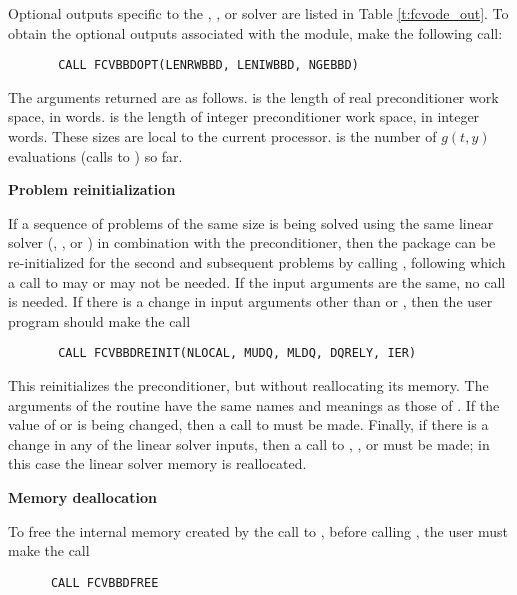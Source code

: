\begin{Steps}
  Optional outputs specific to the {\spgmr}, {\spbcg}, or {\sptfqmr} solver are 
  listed in Table \ref{t:fcvode_out}.
  To obtain the optional outputs associated with the {\cvbbdpre} module, make
  the following call:
\begin{verbatim}
       CALL FCVBBDOPT(LENRWBBD, LENIWBBD, NGEBBD)
\end{verbatim}
  The arguments returned are as follows.
   is the length of real preconditioner work space, in 
  words.  is the length of integer preconditioner work space, in
  integer words.  These sizes are local to the current processor.
   is the number of $g(t,y)$ evaluations (calls to ) so far.
  
\item {\bf Problem reinitialization}
  
  If a sequence of problems of the same size is being solved using the same
  linear solver ({\spgmr}, {\spbcg}, or {\sptfqmr})  in combination with the
  {\cvbbdpre} preconditioner, then the {\cvode} package can be re-initialized
  for the second and subsequent problems by calling ,
  following which a call to  may or may not be needed.
  If the input arguments are the same, no  call is needed.
  If there is a change in input arguments other than  or ,
  then the user program should make the call 
\begin{verbatim}
       CALL FCVBBDREINIT(NLOCAL, MUDQ, MLDQ, DQRELY, IER)
\end{verbatim}
  This reinitializes the {\cvbbdpre} preconditioner, but without
  reallocating its memory.  The arguments of the 
  routine have the same names and meanings as those of .
  If the value of  or  is being changed, then a call to
   must be made.  Finally, if there is a change in any of the
  linear solver inputs, then a call to , , or
   must be made; in this case the linear solver memory is
  reallocated.
  
\item {\bf Memory deallocation}

  To free the internal memory created by the call to , before
  calling , the user must make the call
\begin{verbatim}
      CALL FCVBBDFREE
\end{verbatim}


\end{Steps}
